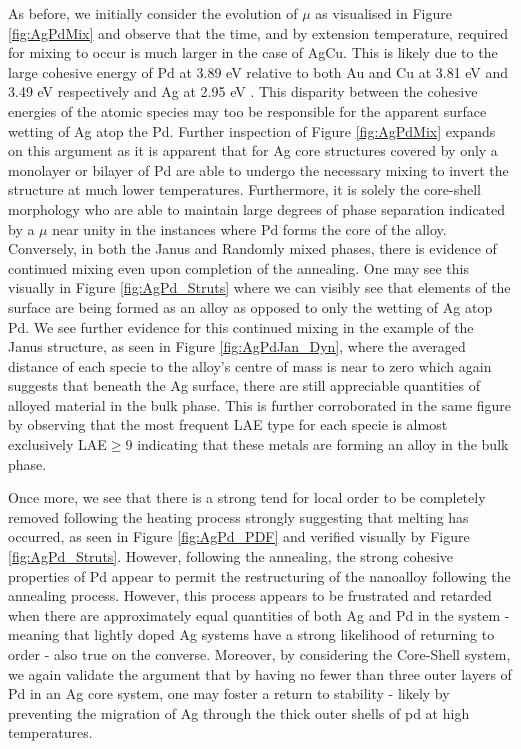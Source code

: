 As before, we initially consider the evolution of $\mu$ as visualised in Figure \ref{fig:AgPdMix} and observe that the time, and by extension temperature, required for mixing to occur is much larger in the case of AgCu. This is likely due to the large cohesive energy of Pd at 3.89 eV relative to both Au and Cu at 3.81 eV and 3.49 eV respectively and Ag at 2.95 eV \cite{kittel_1964}. This disparity between the cohesive energies of the atomic species may too be responsible for the apparent surface wetting of Ag atop the Pd. Further inspection of Figure \ref{fig:AgPdMix} expands on this argument as it is apparent that for Ag core structures covered by only a monolayer or bilayer of Pd are able to undergo the necessary mixing to invert the structure at much lower temperatures. Furthermore, it is solely the core-shell morphology who are able to maintain large degrees of phase separation indicated by a $\mu$ near unity in the instances where Pd forms the core of the alloy. Conversely, in both the Janus and Randomly mixed phases, there is evidence of continued mixing even upon completion of the annealing. One may see this visually in Figure \ref{fig:AgPd_Struts} where we can visibly see that elements of the surface are being formed as an alloy as opposed to only the wetting of Ag atop Pd. We see further evidence for this continued mixing in the example of the Janus structure, as seen in Figure \ref{fig:AgPdJan_Dyn}, where the averaged distance of each specie to the alloy's centre of mass is near to zero which again suggests that beneath the Ag surface, there are still appreciable quantities of alloyed material in the bulk phase. This is further corroborated in the same figure by observing that the most frequent LAE type for each specie is almost exclusively LAE$\geq9$ indicating that these metals are forming an alloy in the bulk phase.

Once more, we see that there is a strong tend for local order to be completely removed following the heating process strongly suggesting that melting has occurred, as seen in Figure \ref{fig:AgPd_PDF} and verified visually by Figure \ref{fig:AgPd_Struts}. However, following the annealing, the strong cohesive properties of Pd appear to permit the restructuring of the nanoalloy following the annealing process. However, this process appears to be frustrated and retarded when there are approximately equal quantities of both Ag and Pd in the system - meaning that lightly doped Ag systems have a strong likelihood of returning to order - also true on the converse. Moreover, by considering the Core-Shell system, we again validate the argument that by having no fewer than three outer layers of Pd in an Ag core system, one may foster a return to stability - likely by preventing the migration of Ag through the thick outer shells of pd at high temperatures.

